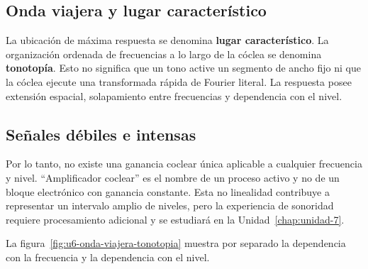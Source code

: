 \subsection{Onda viajera y lugar característico}
\label{sec:u6-onda-viajera}


La ubicación de máxima respuesta se denomina \textbf{lugar característico}.
La organización ordenada de frecuencias a lo largo de la cóclea se denomina
\textbf{tonotopía}. Esto no significa que un tono active un segmento de ancho
fijo ni que la cóclea ejecute una transformada rápida de Fourier literal. La
respuesta posee extensión espacial, solapamiento entre frecuencias y
dependencia con el nivel.


\subsection{Señales débiles e intensas}
\label{sec:u6-debiles-intensas}


Por lo tanto, no existe una ganancia coclear única aplicable a cualquier
frecuencia y nivel. ``Amplificador coclear'' es el nombre de un proceso activo
y no de un bloque electrónico con ganancia constante. Esta no linealidad
contribuye a representar un intervalo amplio de niveles, pero la experiencia
de sonoridad requiere procesamiento adicional y se estudiará en la
Unidad~\ref{chap:unidad-7}.

La figura~\ref{fig:u6-onda-viajera-tonotopia} muestra por separado la
dependencia con la frecuencia y la dependencia con el nivel.

